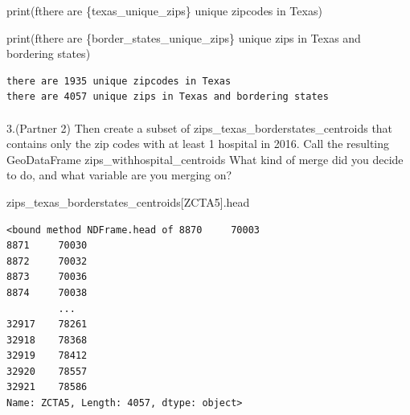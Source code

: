 \documentclass[
  letterpaper,
  DIV=11,
  numbers=noendperiod]{scrartcl}
\makeatletter
\let\oldparagraph\paragraph
\renewcommand{\paragraph}{
    \@ifstar
      \xxxParagraphStar
      \xxxParagraphNoStar
  }
\newcommand{\xxxParagraphStar}[1]{\oldparagraph*{#1}\mbox{}}
\newcommand{\xxxParagraphNoStar}[1]{\oldparagraph{#1}\mbox{}}
\newenvironment{Shaded}{\begin{snugshade}}{\end{snugshade}}
\newcommand{\BuiltInTok}[1]{\textcolor[rgb]{0.00,0.23,0.31}{#1}}
\newcommand{\NormalTok}[1]{\textcolor[rgb]{0.00,0.23,0.31}{#1}}
\newcommand{\SpecialCharTok}[1]{\textcolor[rgb]{0.37,0.37,0.37}{#1}}
\newcommand{\SpecialStringTok}[1]{\textcolor[rgb]{0.13,0.47,0.30}{#1}}
\newcommand{\StringTok}[1]{\textcolor[rgb]{0.13,0.47,0.30}{#1}}
\makeatother
\begin{document}
\begin{Shaded}
\begin{Highlighting}[]
\BuiltInTok{print}\NormalTok{(}\SpecialStringTok{f\textquotesingle{}there are }\SpecialCharTok{\{}\NormalTok{texas\_unique\_zips}\SpecialCharTok{\}}\SpecialStringTok{ unique zipcodes in Texas\textquotesingle{}}\NormalTok{)}

\BuiltInTok{print}\NormalTok{(}\SpecialStringTok{f\textquotesingle{}there are }\SpecialCharTok{\{}\NormalTok{border\_states\_unique\_zips}\SpecialCharTok{\}}\SpecialStringTok{ unique zips in Texas and bordering states\textquotesingle{}}\NormalTok{)}
\end{Highlighting}
\end{Shaded}

\begin{verbatim}
there are 1935 unique zipcodes in Texas
there are 4057 unique zips in Texas and bordering states
\end{verbatim}

\paragraph{3.(Partner 2) Then create a subset of
zips\_texas\_borderstates\_centroids that contains only the zip codes
with at least 1 hospital in 2016. Call the resulting GeoDataFrame
zips\_withhospital\_centroids What kind of merge did you decide to do,
and what variable are you merging
on?}\label{partner-2-then-create-a-subset-of-zips_texas_borderstates_centroids-that-contains-only-the-zip-codes-with-at-least-1-hospital-in-2016.-call-the-resulting-geodataframe-zips_withhospital_centroids-what-kind-of-merge-did-you-decide-to-do-and-what-variable-are-you-merging-on}

\begin{Shaded}
\begin{Highlighting}[]
\NormalTok{zips\_texas\_borderstates\_centroids[}\StringTok{\textquotesingle{}ZCTA5\textquotesingle{}}\NormalTok{].head}
\end{Highlighting}
\end{Shaded}

\begin{verbatim}
<bound method NDFrame.head of 8870     70003
8871     70030
8872     70032
8873     70036
8874     70038
         ...  
32917    78261
32918    78368
32919    78412
32920    78557
32921    78586
Name: ZCTA5, Length: 4057, dtype: object>
\end{verbatim}
\end{document}
